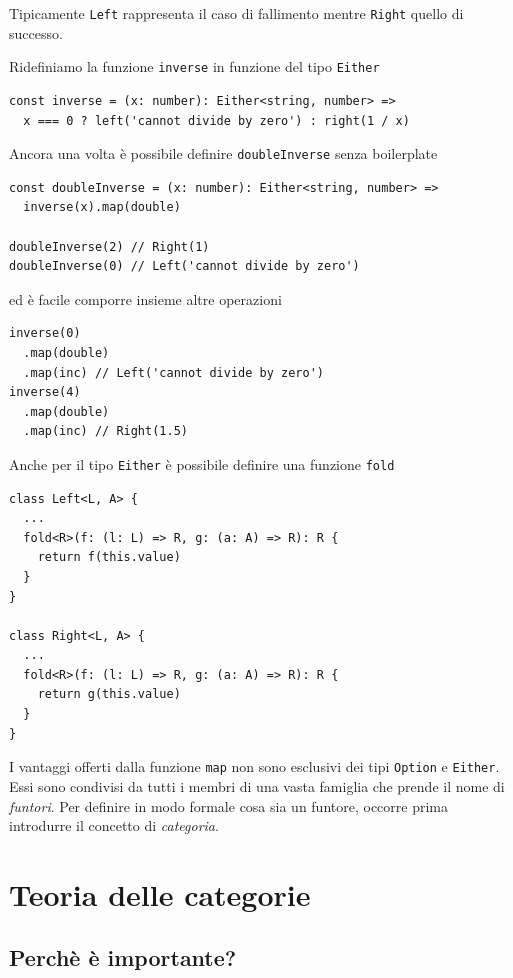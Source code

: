 \documentclass[12pt]{article}
\begin{document}
Tipicamente \texttt{Left} rappresenta il caso di fallimento mentre \texttt{Right} quello di successo.

Ridefiniamo la funzione \texttt{inverse} in funzione del tipo \texttt{Either}

\begin{verbatim}
const inverse = (x: number): Either<string, number> =>
  x === 0 ? left('cannot divide by zero') : right(1 / x)
\end{verbatim}

Ancora una volta è possibile definire \texttt{doubleInverse} senza boilerplate

\begin{verbatim}
const doubleInverse = (x: number): Either<string, number> =>
  inverse(x).map(double)

doubleInverse(2) // Right(1)
doubleInverse(0) // Left('cannot divide by zero')
\end{verbatim}

ed è facile comporre insieme altre operazioni

\begin{verbatim}
inverse(0)
  .map(double)
  .map(inc) // Left('cannot divide by zero')
inverse(4)
  .map(double)
  .map(inc) // Right(1.5)
\end{verbatim}

Anche per il tipo \texttt{Either} è possibile definire una funzione \texttt{fold}

\begin{verbatim}
class Left<L, A> {
  ...
  fold<R>(f: (l: L) => R, g: (a: A) => R): R {
    return f(this.value)
  }
}

class Right<L, A> {
  ...
  fold<R>(f: (l: L) => R, g: (a: A) => R): R {
    return g(this.value)
  }
}
\end{verbatim}

I vantaggi offerti dalla funzione \texttt{map} non sono esclusivi dei tipi \texttt{Option} e \texttt{Either}.
Essi sono condivisi da tutti i membri di una vasta famiglia che prende il nome di \emph{funtori}. Per definire in modo formale cosa sia un funtore,
occorre prima introdurre il concetto di \emph{categoria}.

\section{Teoria delle categorie}

\subsection{Perchè è importante?}
\end{document}
